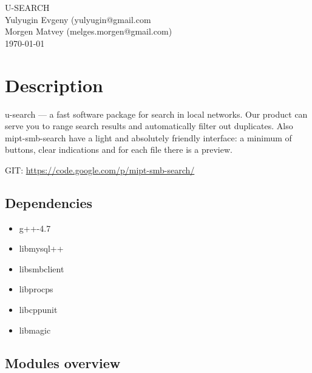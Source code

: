 \documentclass[11pt, oneside, a4paper]{book}
\begin{document}
\hypersetup{pageanchor=true,citecolor=blue,colorlinks=true, linkcolor=black, filecolor=black, citecolor=black, urlcolor=blue, pdfauthor = Evgeny Yulyugin, pdftitle=mipt-smb-search guide}

\begin{titlepage}
\vspace*{7cm}
\begin{center}
{\Large U-\/\-S\-E\-A\-R\-C\-H }\\
\vspace*{1cm}
{\large Yulyugin Evgeny (yulyugin@gmail.com}\\
{\large Morgen Matvey (melges.morgen@gmail.com)}\\
\vspace*{0.5cm}
{\small \today}\\
\end{center}
\end{titlepage}
\clearemptydoublepage
{}
\tableofcontents
\clearemptydoublepage
{}

\chapter{Description}

u-search --- a fast software package for search in local networks. Our product can serve you to range search results and automatically filter out duplicates. Also mipt-smb-search have a light and absolutely friendly interface: a minimum of buttons, clear indications and for each file there is a preview.

GIT: \url{https://code.google.com/p/mipt-smb-search/}

\section{Dependencies}

\begin{itemize}
  \item g++-4.7
  \item libmysql++
  \item libsmbclient
  \item libprocps
  \item libcppunit
  \item libmagic
\end{itemize}

\section{Modules overview}
\end{document}

